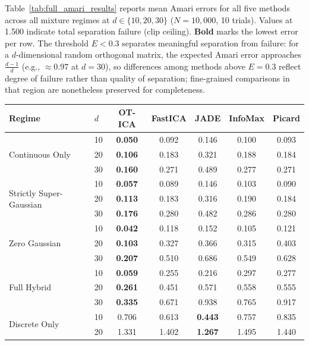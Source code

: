\documentclass[accepted]{tpm2026} %
\begin{document}
Table~\ref{tab:full_amari_results} reports mean Amari errors for all five methods across all mixture regimes at $d \in \{10, 20, 30\}$ ($N=10{,}000$, 10 trials). Values at 1.500 indicate total separation failure (clip ceiling). \textbf{Bold} marks the lowest error per row. The threshold $E < 0.3$ separates meaningful separation from failure: for a $d$-dimensional random orthogonal matrix, the expected Amari error approaches $\frac{d-1}{d}$ (e.g., $\approx 0.97$ at $d=30$), so differences among methods above $E=0.3$ reflect degree of failure rather than quality of separation; fine-grained comparisons in that region are nonetheless preserved for completeness.

\begin{table}[htbp]
\centering
\setlength{\tabcolsep}{10pt}
\begin{tabular}{llccccc}
\toprule
\textbf{Regime} & $d$ & \textbf{OT-ICA} & \textbf{FastICA} & \textbf{JADE} & \textbf{InfoMax} & \textbf{Picard} \\
\midrule
\multirow{3}{*}{Continuous Only}
 & 10 & \textbf{0.050} & 0.092 & 0.146 & 0.100 & 0.093 \\
 & 20 & \textbf{0.106} & 0.183 & 0.321 & 0.188 & 0.184 \\
 & 30 & \textbf{0.160} & 0.271 & 0.489 & 0.277 & 0.271 \\
\midrule
\multirow{3}{*}{Strictly Super-Gaussian}
 & 10 & \textbf{0.057} & 0.089 & 0.146 & 0.103 & 0.090 \\
 & 20 & \textbf{0.113} & 0.183 & 0.316 & 0.190 & 0.184 \\
 & 30 & \textbf{0.176} & 0.280 & 0.482 & 0.286 & 0.280 \\
\midrule
\multirow{3}{*}{Zero Gaussian}
 & 10 & \textbf{0.042} & 0.118 & 0.152 & 0.105 & 0.121 \\
 & 20 & \textbf{0.103} & 0.327 & 0.366 & 0.315 & 0.403 \\
 & 30 & \textbf{0.207} & 0.510 & 0.686 & 0.549 & 0.628 \\
\midrule
\multirow{3}{*}{Full Hybrid}
 & 10 & \textbf{0.059} & 0.255 & 0.216 & 0.297 & 0.277 \\
 & 20 & \textbf{0.261} & 0.451 & 0.571 & 0.558 & 0.555 \\
 & 30 & \textbf{0.335} & 0.671 & 0.938 & 0.765 & 0.917 \\
\midrule
\multirow{3}{*}{Discrete Only}
 & 10 & 0.706 & 0.613 & \textbf{0.443} & 0.757 & 0.835 \\
 & 20 & 1.331 & 1.402 & \textbf{1.267} & 1.495 & 1.440 \\

\end{tabular}
\end{table}
\end{document}
